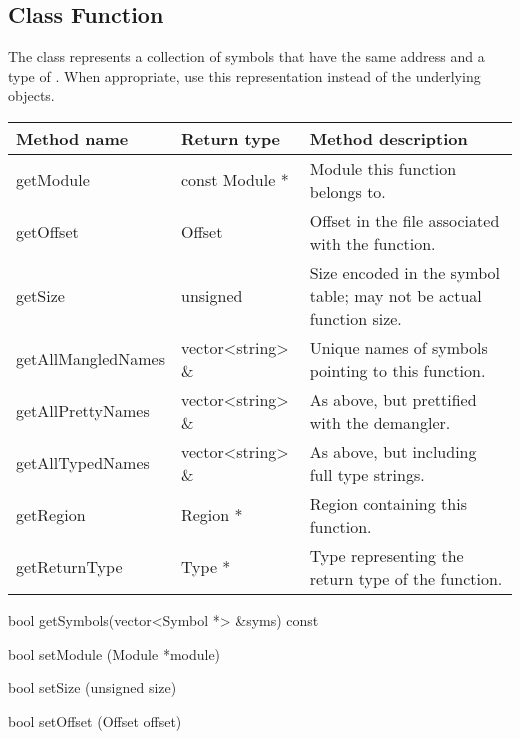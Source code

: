 \subsection{Class Function}\label{Function}
The  class represents a collection of symbols that have the same address
and a type of . When appropriate, use this representation instead of the underlying  objects. 

\begin{tabular}{p{1.25in}p{1.125in}p{3.125in}}
	Method name & Return type & Method description \\
	\hline
	getModule & const Module * & Module this function belongs to. \\
	getOffset & Offset & Offset in the file associated with the function. \\
	getSize & unsigned & Size encoded in the symbol table; may not be actual function size. \\
	getAllMangledNames & vector<string> \& & Unique names of symbols pointing to this function. \\
	getAllPrettyNames & vector<string> \& & As above, but prettified with the demangler. \\
	getAllTypedNames & vector<string> \& & As above, but including full type strings. \\
	getRegion & Region * & Region containing this function. \\
	getReturnType & Type * & Type representing the return type of the function. \\
\end{tabular}
	
\begin{apient}
bool getSymbols(vector<Symbol *> &syms) const
\end{apient}

\begin{apient}
bool setModule (Module *module)
\end{apient}

\begin{apient}
bool setSize (unsigned size)
\end{apient}

\begin{apient}
bool setOffset (Offset offset)
\end{apient}

